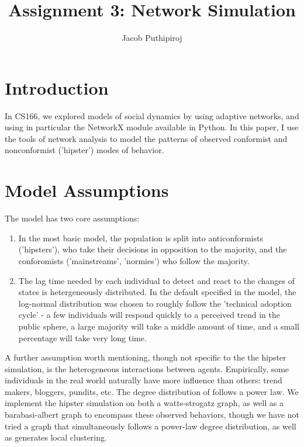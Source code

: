\documentclass{article}
\begin{document}
\title{Assignment 3: Network Simulation}
\author{Jacob Puthipiroj}
\maketitle

\makeatletter
\newcommand{\mybox}{%
    \collectbox{%
        \setlength{\fboxsep}{1pt}%
        \fbox{\BOXCONTENT}%
    }%
}


\section*{Introduction}
In CS166, we explored models of social dynamics by using adaptive networks, and using in particular the NetworkX module available in Python. In this paper, I use the tools of network analysis to model the patterns of observed conformist and nonconformist ('hipster') modes of behavior. 

\section*{Model Assumptions}
The model has two core assumptions:
\begin{enumerate}
\item In the most basic model, the population is split into anticonformists ('hipsters'), who take their decisions in opposition to the majority, and the conforomists ('mainstreams', 'normies') who follow the majority.  
\item The lag time needed by each individual to detect and react to the changes of states is hetergeneously distributed. In the default specified in the model, the log-normal distribution was chosen to roughly follow the 'technical adoption cycle' - a few individuals will respond quickly to a perceived trend in the public sphere, a large majority will take a middle amount of time, and a small percentage will take very long time. 
\end{enumerate}
A further assumption worth mentioning, though not specific to the the hipster simulation, is the heterogeneous interactions between agents. Empirically, some individuals in the real world naturally have more influence than others: trend makers, bloggers, pundits, etc. The degree distribution of follows a power law. We implement the hipster simulation on both a watts-strogatz graph, as well as a barabasi-albert graph to encompass these observed behaviors, though we have not tried a graph that simultaneously follows a power-law degree distribution, as well as generates local clustering.\\
\end{document}
